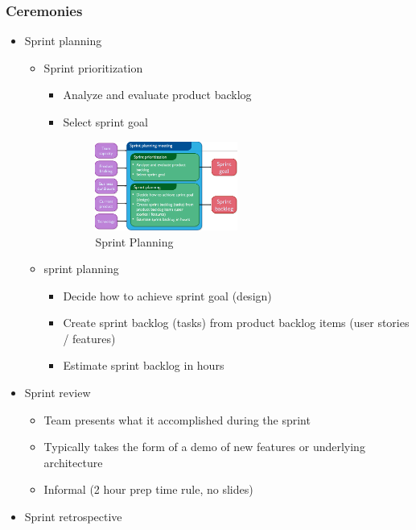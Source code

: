 \hypertarget{ceremonies}{%
\subsubsection{Ceremonies}\label{ceremonies}}

\begin{itemize}
\tightlist
\item
  Sprint planning

  \begin{itemize}
  \tightlist
  \item
    Sprint prioritization

    \begin{itemize}
    \tightlist
    \item
      Analyze and evaluate product backlog
    \item
      Select sprint goal

      \begin{figure}[H]
\centering
\includegraphics[width=0.5\textwidth]{figures/ScrumCeremonies.png}
\caption{Sprint Planning}
\end{figure}
    \end{itemize}
  \item
    sprint planning

    \begin{itemize}
    \tightlist
    \item
      Decide how to achieve sprint goal (design)
    \item
      Create sprint backlog (tasks) from product backlog items (user
      stories / features)
    \item
      Estimate sprint backlog in hours
    \end{itemize}
  \end{itemize}
\item
  Sprint review

  \begin{itemize}
  \tightlist
  \item
    Team presents what it accomplished during the sprint
  \item
    Typically takes the form of a demo of new features or underlying
    architecture
  \item
    Informal (2 hour prep time rule, no slides)
  \end{itemize}
\item
  Sprint retrospective


\end{itemize}
